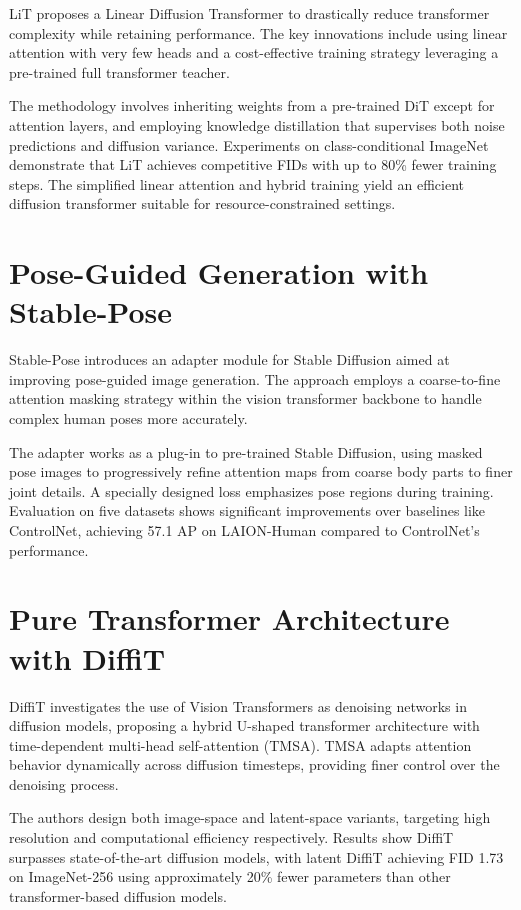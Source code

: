 \documentclass[a4paper]{article}
\begin{document}
LiT proposes a Linear Diffusion Transformer to drastically reduce transformer complexity while retaining performance. The key innovations include using linear attention with very few heads and a cost-effective training strategy leveraging a pre-trained full transformer teacher.

The methodology involves inheriting weights from a pre-trained DiT except for attention layers, and employing knowledge distillation that supervises both noise predictions and diffusion variance. Experiments on class-conditional ImageNet demonstrate that LiT achieves competitive FIDs with up to 80\% fewer training steps. The simplified linear attention and hybrid training yield an efficient diffusion transformer suitable for resource-constrained settings.

\section{Pose-Guided Generation with Stable-Pose}

Stable-Pose introduces an adapter module for Stable Diffusion aimed at improving pose-guided image generation. The approach employs a coarse-to-fine attention masking strategy within the vision transformer backbone to handle complex human poses more accurately.

The adapter works as a plug-in to pre-trained Stable Diffusion, using masked pose images to progressively refine attention maps from coarse body parts to finer joint details. A specially designed loss emphasizes pose regions during training. Evaluation on five datasets shows significant improvements over baselines like ControlNet, achieving 57.1 AP on LAION-Human compared to ControlNet's performance.

\section{Pure Transformer Architecture with DiffiT}

DiffiT investigates the use of Vision Transformers as denoising networks in diffusion models, proposing a hybrid U-shaped transformer architecture with time-dependent multi-head self-attention (TMSA). TMSA adapts attention behavior dynamically across diffusion timesteps, providing finer control over the denoising process.

The authors design both image-space and latent-space variants, targeting high resolution and computational efficiency respectively. Results show DiffiT surpasses state-of-the-art diffusion models, with latent DiffiT achieving FID 1.73 on ImageNet-256 using approximately 20\% fewer parameters than other transformer-based diffusion models.
\end{document}
